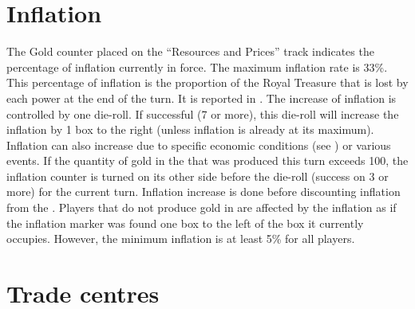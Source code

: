 \section{Inflation}

\aparag The Gold counter placed on the ``Resources and Prices'' track
indicates the percentage of inflation currently in force. The maximum
inflation rate is 33\%.
\bparag This percentage of inflation is the proportion of the Royal Treasure
that is lost by each power at the end of the turn. It is reported in
.
 The increase of inflation is controlled by one
die-roll. If successful (7 or more), this die-roll will increase the inflation
by 1 box to the right (unless inflation is already at its maximum).
\bparag Inflation can also increase due to specific economic conditions (see
) or various events.
\bparag \label{chInter:InflationGoldROTW} If the quantity of gold in the \ROTW
that was produced this turn exceeds 100\ducats, the inflation counter is
turned on its other side before the die-roll (success on 3 or more) for the
current turn.
\bparag Inflation increase is done before discounting inflation from the \RT.
 \label{chInter:InflationGold} Players that do not
produce gold in  are affected by the inflation as if the
inflation marker was found one box to the left of the box it currently
occupies.
\bparag However, the minimum inflation is at least 5\% for all players.



\section{Trade centres}\label{chInter:TradeCentres}

